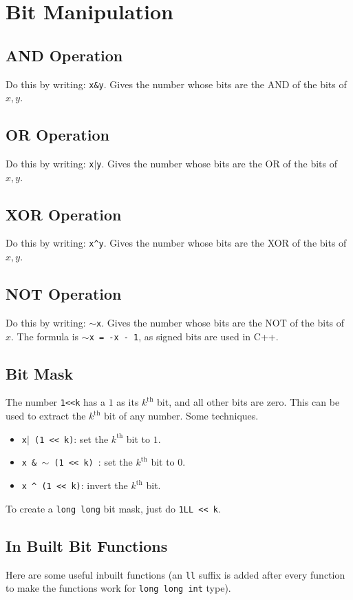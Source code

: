 \documentclass[12pt,a4paper]{amsart}
\numberwithin{equation}{section}
\theoremstyle{definition}
\begin{document}
\section{Bit Manipulation}

\subsection{AND Operation} Do this by writing: \verb|x&y|. Gives the number whose bits are the AND of the bits of $x,y$.

\subsection{OR Operation} Do this by writing: \verb|x|$|$\verb|y|. Gives the number whose bits are the OR of the bits of $x,y$.

\subsection{XOR Operation} Do this by writing: \verb|x^y|. Gives the number whose bits are the XOR of the bits of $x,y$.

\subsection{NOT Operation} Do this by writing: $\sim$\verb|x|. Gives the number whose bits are the NOT of the bits of $x$. The formula is $\sim$\verb|x = -x - 1|, as signed bits are used in C++.

\subsection{Bit Mask} The number \verb|1<<k| has a $1$ as its $k^\text{th}$ bit, and all other bits are zero. This can be used to extract the $k^{\text{th}}$ bit of any number. Some techniques. 
\begin{itemize}
    \item \verb|x|$|$\verb| (1 << k)|: set the $k^\text{th}$ bit to $1$.
    \item \verb|x & |$\sim$\verb| (1 << k) |: set the $k^\text{th}$ bit to $0$.
    \item \verb|x ^ (1 << k)|: invert the $k^\text{th}$ bit.
\end{itemize}
To create a \verb|long long| bit mask, just do \verb|1LL << k|.

\subsection{In Built Bit Functions} Here are some useful inbuilt functions (an \verb|ll| suffix is added after every function to make the functions work for \verb|long long int| type). 
\end{document}
